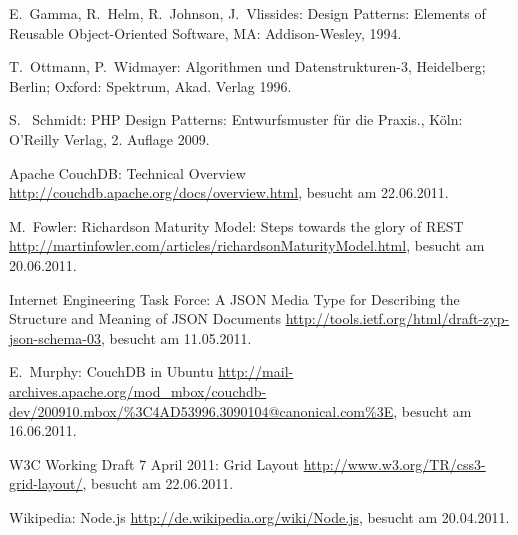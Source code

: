 \begin{thebibliography}{99}

  E.\ Gamma, R.\ Helm, R.\ Johnson, J.\ Vlissides:
    Design Patterns: Elements of Reusable Object-Oriented Software,
	MA: Addison-Wesley, 1994.
	
  T.\ Ottmann, P.\ Widmayer:
	Algorithmen und Datenstrukturen-3,
	Heidelberg; Berlin; Oxford: Spektrum, Akad. Verlag 1996.

  S. \ Schmidt:
	PHP Design Patterns: Entwurfsmuster für die Praxis.,
	Köln: O'Reilly Verlag, 2. Auflage 2009.


\hspace{-\leftmargin}{\Large\bfseries Web-Referenzen} %

	Apache CouchDB:
	Technical Overview
	\url{http://couchdb.apache.org/docs/overview.html},
	besucht am 22.06.2011.

	M.\ Fowler:
	Richardson Maturity Model: Steps towards the glory of REST
	\url{http://martinfowler.com/articles/richardsonMaturityModel.html},
	besucht am 20.06.2011.
	
	Internet Engineering Task Force:
	A JSON Media Type for Describing the Structure and Meaning of JSON Documents
	\url{http://tools.ietf.org/html/draft-zyp-json-schema-03},
	besucht am 11.05.2011.

	E.\ Murphy:
	CouchDB in Ubuntu
	\url{http://mail-archives.apache.org/mod_mbox/couchdb-dev/200910.mbox/%3C4AD53996.3090104@canonical.com%3E}, besucht am 16.06.2011.

	W3C Working Draft 7 April 2011:
	Grid Layout
	\url{http://www.w3.org/TR/css3-grid-layout/}, besucht am 22.06.2011.

  Wikipedia: Node.js
    \url{http://de.wikipedia.org/wiki/Node.js}, besucht am 20.04.2011.
	

\end{thebibliography}